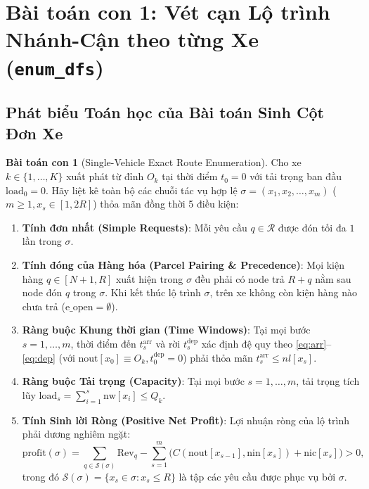 \documentclass[11pt,a4paper]{article}
\theoremstyle{definition}
\newtheorem{subproblem}{Bài toán con}[section]
\begin{document}
\section{Bài toán con 1: Vét cạn Lộ trình Nhánh-Cận theo từng Xe (\texttt{enum\_dfs})}

\subsection{Phát biểu Toán học của Bài toán Sinh Cột Đơn Xe}
\begin{subproblem}[Single-Vehicle Exact Route Enumeration]
Cho xe $k \in \{1, \dots, K\}$ xuất phát từ đỉnh $O_k$ tại thời điểm $t_0 = 0$ với tải trọng ban đầu $\text{load}_0 = 0$. Hãy liệt kê toàn bộ các chuỗi tác vụ hợp lệ $\sigma = (x_1, x_2, \dots, x_m)$ ($m \ge 1, x_s \in [1, 2R]$) thỏa mãn đồng thời 5 điều kiện:
\begin{enumerate}[label=(C\arabic*), leftmargin=2.2em]
    \item \textbf{Tính đơn nhất (Simple Requests)}: Mỗi yêu cầu $q \in \mathcal{R}$ được đón tối đa $1$ lần trong $\sigma$.
    \item \textbf{Tính đóng của Hàng hóa (Parcel Pairing \& Precedence)}: Mọi kiện hàng $q \in [N+1, R]$ xuất hiện trong $\sigma$ đều phải có node trả $R+q$ nằm sau node đón $q$ trong $\sigma$. Khi kết thúc lộ trình $\sigma$, trên xe không còn kiện hàng nào chưa trả ($\text{e\_open} = \emptyset$).
    \item \textbf{Ràng buộc Khung thời gian (Time Windows)}: Tại mọi bước $s = 1, \dots, m$, thời điểm đến $t^{\text{arr}}_s$ và rời $t^{\text{dep}}_s$ xác định đệ quy theo \eqref{eq:arr}--\eqref{eq:dep} (với $\text{nout}[x_0] \equiv O_k, t^{\text{dep}}_0 = 0$) phải thỏa mãn $t^{\text{arr}}_s \le nl[x_s]$.
    \item \textbf{Ràng buộc Tải trọng (Capacity)}: Tại mọi bước $s = 1, \dots, m$, tải trọng tích lũy $\text{load}_s = \sum_{i=1}^s \text{nw}[x_i] \le Q_k$.
    \item \textbf{Tính Sinh lời Ròng (Positive Net Profit)}: Lợi nhuận ròng của lộ trình phải dương nghiêm ngặt:
    \begin{equation}
        \text{profit}(\sigma) = \sum_{q \in \mathcal{S}(\sigma)} \text{Rev}_q - \sum_{s=1}^m \Big( C(\text{nout}[x_{s-1}], \text{nin}[x_s]) + \text{nic}[x_s] \Big) > 0,
        \label{eq:col_profit}
    \end{equation}
    trong đó $\mathcal{S}(\sigma) = \{x_s \in \sigma : x_s \le R\}$ là tập các yêu cầu được phục vụ bởi $\sigma$.
\end{enumerate}
\end{subproblem}
\end{document}
